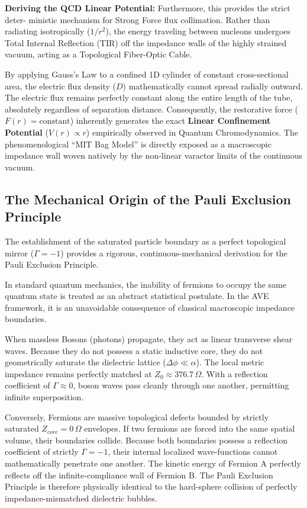 \textbf{Deriving the QCD Linear Potential:} Furthermore, this provides the strict deter-
ministic mechanism for Strong Force flux collimation. Rather than radiating isotropically
($1/r^{2}$), the energy traveling between nucleons undergoes Total Internal Reflection (TIR) off
the impedance walls of the highly strained vacuum, acting as a Topological Fiber-Optic Cable.

By applying Gauss's Law to a confined 1D cylinder of constant cross-sectional area,
the electric flux density ($D$) mathematically cannot spread radially outward. The electric
flux remains perfectly constant along the entire length of the tube, absolutely regardless
of separation distance. Consequently, the restorative force ($F(r) = \text{constant}$) inherently
generates the exact \textbf{Linear Confinement Potential} ($V(r)\propto r$) empirically observed in
Quantum Chromodynamics. The phenomenological ``MIT Bag Model'' is directly exposed
as a macroscopic impedance wall woven natively by the non-linear varactor limits of the
continuous vacuum.

\subsection{The Mechanical Origin of the Pauli Exclusion Principle}

The establishment of the saturated particle boundary as a perfect topological mirror ($\Gamma = -1$\gammaundeclared{})
provides a rigorous, continuous-mechanical derivation for the Pauli Exclusion Principle. 

In standard quantum mechanics, the inability of fermions to occupy the same quantum
state is treated as an abstract statistical postulate. In the AVE framework, it is an unavoidable
consequence of classical macroscopic impedance boundaries. 

When massless Bosons (photons) propagate, they act as linear transverse shear waves.
Because they do not possess a static inductive core, they do not geometrically saturate
the dielectric lattice ($\Delta\phi \ll \alpha$). The local metric impedance remains perfectly matched at
$Z_{0} \approx 376.7\,\Omega$. With a reflection coefficient of $\Gamma \approx 0$, boson waves pass cleanly through one
another, permitting infinite superposition.

Conversely, Fermions are massive topological defects bounded by strictly saturated $Z_{core} =
0\,\Omega$ envelopes. If two fermions are forced into the same spatial volume, their boundaries
collide. Because both boundaries possess a reflection coefficient of strictly $\Gamma = -1$\gammaundeclared{}, their
internal localized wave-functions cannot mathematically penetrate one another. The kinetic
energy of Fermion A perfectly reflects off the infinite-compliance wall of Fermion B. The Pauli
Exclusion Principle is therefore physically identical to the hard-sphere collision of perfectly
impedance-mismatched dielectric bubbles.


